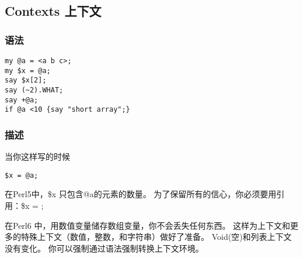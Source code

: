 \documentclass{ctexart}
\begin{document}
\begin{lstlisting}

\end{lstlisting}
\subsection{Contexts 上下文}
\label{sec-4-7}
\subsubsection{语法}
\label{sec-4-7-1}


\begin{lstlisting}
my @a = <a b c>;
my $x = @a;
say $x[2];
say (~2).WHAT;
say +@a;
if @a <10 {say "short array";}
\end{lstlisting}
\subsubsection{描述}
\label{sec-4-7-2}

当你这样写的时候

\begin{lstlisting}
$x = @a;
\end{lstlisting}
在Perl5中，\$x 只包含@a的元素的数量。
为了保留所有的信心，你必须要用引用：\$x = \@a;

在Perl6 中，用数值变量储存数组变量，你不会丢失任何东西。
这样为上下文和更多的特殊上下文（数值，整数，和字符串）做好了准备。
Void(空)和列表上下文没有变化。
你可以强制通过语法强制转换上下文环境。
\end{document}
